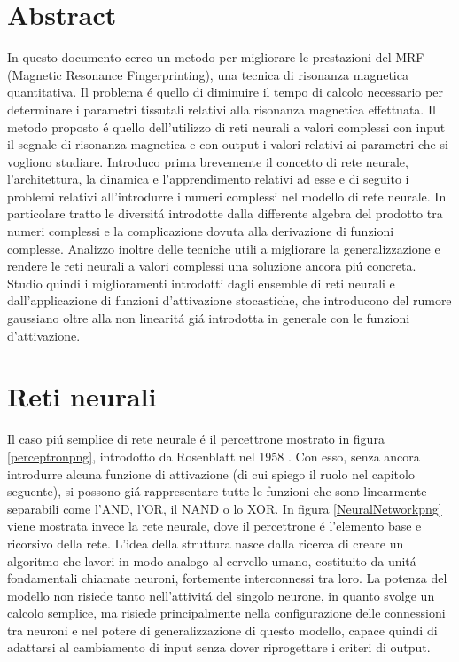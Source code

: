 \documentclass[a4paper,10pt]{article}
\date{12/08/2019}
\begin{document}
 
 \section{Abstract}
 
 In questo documento cerco un metodo per migliorare le prestazioni del MRF (Magnetic Resonance Fingerprinting), una tecnica di risonanza magnetica quantitativa. Il problema \'e quello di diminuire il tempo di calcolo necessario per determinare i parametri tissutali relativi alla risonanza magnetica effettuata. Il metodo proposto \'e quello dell'utilizzo di reti neurali a valori complessi con input il segnale di risonanza magnetica e con output i valori relativi ai parametri che si vogliono studiare. 
 Introduco prima brevemente il concetto di rete neurale, l'architettura, la dinamica e l'apprendimento relativi ad esse e di seguito i problemi relativi all'introdurre i numeri complessi nel modello di rete neurale. In particolare tratto le diversit\'a introdotte dalla differente algebra del prodotto tra numeri complessi e la complicazione dovuta alla derivazione di funzioni complesse.
 Analizzo inoltre delle tecniche utili a migliorare la generalizzazione e rendere le reti neurali a valori complessi una soluzione ancora pi\'u concreta. Studio quindi i miglioramenti introdotti dagli ensemble di reti neurali e dall'applicazione di funzioni d'attivazione stocastiche, che introducono del rumore gaussiano oltre alla non linearit\'a gi\'a introdotta in generale con le funzioni d'attivazione.
 
 
 \section{Reti neurali}  
 Il caso pi\'u semplice di rete neurale \'e il percettrone mostrato in figura \ref{perceptronpng}, introdotto da Rosenblatt nel 1958 \cite{rosenblatt1958perceptron}. Con esso, senza ancora introdurre alcuna funzione di attivazione (di cui spiego il ruolo nel capitolo seguente), si possono gi\'a rappresentare tutte le funzioni che sono linearmente separabili come l'AND, l'OR, il NAND o lo XOR. In figura \ref{NeuralNetworkpng} viene mostrata invece la rete neurale, dove il percettrone \'e l'elemento base e ricorsivo della rete. 
 L'idea della struttura nasce dalla ricerca di creare un algoritmo che lavori in modo analogo al cervello umano, costituito da unit\'a fondamentali chiamate neuroni, fortemente interconnessi tra loro. La potenza del modello non risiede tanto nell'attivit\'a del singolo neurone, in quanto svolge un calcolo semplice, ma risiede principalmente nella configurazione delle connessioni tra neuroni e nel potere di generalizzazione di questo modello, capace quindi di adattarsi al cambiamento di input senza dover riprogettare i criteri di output.
 
\end{document}

